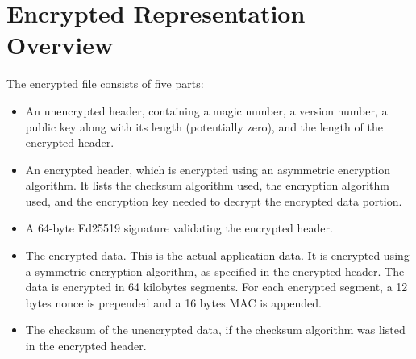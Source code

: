 \section{Encrypted Representation Overview}
The encrypted file consists of five parts:

\begin{itemize}
\item An unencrypted header, containing a magic number, a version number, a public key along with its length (potentially zero), and the length of the encrypted header.
\item An encrypted header, which is encrypted using an asymmetric encryption algorithm. 
  It lists the checksum algorithm used, the encryption algorithm used, and the encryption key needed to decrypt the encrypted data portion.
\item A 64-byte Ed25519 signature validating the encrypted header.
\item The encrypted data.
  This is the actual application data.
  It is encrypted using a symmetric encryption algorithm, as specified in the encrypted header.
  The data is encrypted in 64 kilobytes segments. For each encrypted segment, a 12 bytes nonce is prepended and a 16 bytes MAC is appended.
\item The checksum of the unencrypted data, if the checksum algorithm was listed in the encrypted header.
\end{itemize}
